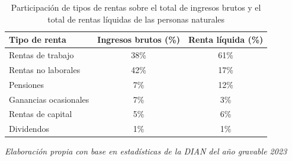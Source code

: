 \begin{table}[ht]
\centering
\caption{Participación de tipos de rentas sobre el total de ingresos brutos y el total de rentas líquidas de las personas naturales}
\label{tab:composicion_renta}
\begin{tabular}{lcc}
\hline
\textbf{Tipo de renta} & \textbf{Ingresos brutos (\%)} & \textbf{Renta líquida (\%)} \\
\hline
Rentas de trabajo         & 38\% & 61\% \\
Rentas no laborales       & 42\% & 17\% \\
Pensiones                 & 7\%  & 12\% \\
Ganancias ocasionales     & 7\%  & 3\%  \\
Rentas de capital         & 5\%  & 6\%  \\
Dividendos                & 1\%  & 1\%  \\
\hline
\end{tabular}
\vspace{0.1cm}
\par \footnotesize{\textit{Elaboración propia con base en estadísticas de la DIAN del año gravable 2023}}
\end{table}
